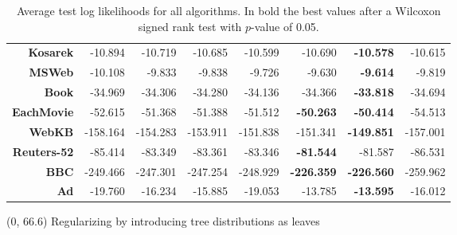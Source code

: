 \documentclass[final]{beamer}
\begin{document}
\begin{frame}{}
\begin{textblock}{25.2}
\begin{table}[!htbp]
\begin{tabular}{r r r r r r r r}
          \textbf{Kosarek}    & -10.894           & -10.719        & -10.685         & -10.599          & -10.690           & \textbf{-10.578}  & -10.615          \\
          \textbf{MSWeb}      & -10.108           & -9.833         & -9.838          & -9.726           & -9.630            & \textbf{-9.614}   & -9.819           \\
          \textbf{Book}       & -34.969           & -34.306        & -34.280         & -34.136          & -34.366           & \textbf{-33.818}  & -34.694          \\
          \textbf{EachMovie}  & -52.615           & -51.368        & -51.388         & -51.512          & \textbf{-50.263}  & \textbf{-50.414}  & -54.513          \\
          \textbf{WebKB}      & -158.164          & -154.283       & -153.911        & -151.838         & -151.341          & \textbf{-149.851} & -157.001         \\
          \textbf{Reuters-52} & -85.414           & -83.349        & -83.361         & -83.346          & \textbf{-81.544}  & -81.587           & -86.531          \\
          \textbf{BBC}        & -249.466          & -247.301       & -247.254        & -248.929         & \textbf{-226.359} & \textbf{-226.560} & -259.962         \\
          \textbf{Ad}         & -19.760           & -16.234        & -15.885         & -19.053          & -13.785           & \textbf{-13.595}  & -16.012          \\
          \bottomrule
        \end{tabular}
        \caption[Experimentation results]{\scriptsize Average test
          log likelihoods for all algorithms. In bold the best values
          after a Wilcoxon signed rank test with $p$-value of 0.05.}
        \label{tab:resexp}
      \end{table}   



      
      \end{textblock}


        
  \begin{textblock}{80}(0, 66.6)
    Regularizing by introducing tree distributions as leaves
  \end{textblock}
  

\end{frame}
\end{document}
